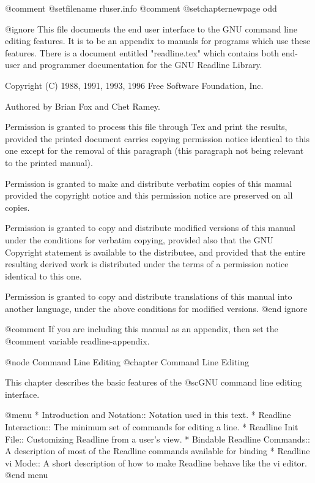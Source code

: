 @comment %
@setfilename rluser.info
@comment %
@setchapternewpage odd

@ignore
This file documents the end user interface to the GNU command line
editing features.  It is to be an appendix to manuals for programs which
use these features.  There is a document entitled "readline.tex"
which contains both end-user and programmer documentation for the GNU
Readline Library.

Copyright (C) 1988, 1991, 1993, 1996 Free Software Foundation, Inc.

Authored by Brian Fox and Chet Ramey.

Permission is granted to process this file through Tex and print the
results, provided the printed document carries copying permission notice
identical to this one except for the removal of this paragraph (this
paragraph not being relevant to the printed manual).

Permission is granted to make and distribute verbatim copies of this manual
provided the copyright notice and this permission notice are preserved on
all copies.

Permission is granted to copy and distribute modified versions of this
manual under the conditions for verbatim copying, provided also that the
GNU Copyright statement is available to the distributee, and provided that
the entire resulting derived work is distributed under the terms of a
permission notice identical to this one.

Permission is granted to copy and distribute translations of this manual
into another language, under the above conditions for modified versions.
@end ignore

@comment If you are including this manual as an appendix, then set the
@comment variable readline-appendix.

@node Command Line Editing
@chapter Command Line Editing

This chapter describes the basic features of the @sc{GNU}
command line editing interface.

@menu
* Introduction and Notation::   Notation used in this text.
* Readline Interaction::        The minimum set of commands for editing a line.
* Readline Init File::          Customizing Readline from a user's view.
* Bindable Readline Commands::  A description of most of the Readline commands
                                available for binding
* Readline vi Mode::            A short description of how to make Readline
                                behave like the vi editor.
@end menu

